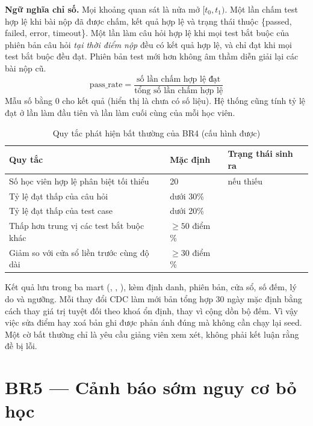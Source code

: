 \textbf{Ngữ nghĩa chỉ số.} Mọi khoảng quan sát là nửa mở $[t_0, t_1)$. Một lần chấm test hợp lệ khi bài nộp đã được chấm, kết quả hợp lệ và trạng thái thuộc \{passed, failed, error, timeout\}. Một lần làm câu hỏi hợp lệ khi mọi test bắt buộc của phiên bản câu hỏi \emph{tại thời điểm nộp} đều có kết quả hợp lệ, và chỉ đạt khi mọi test bắt buộc đều đạt. Phiên bản test mới hơn không âm thầm diễn giải lại các bài nộp cũ.
\[
  \text{pass\_rate} = \frac{\text{số lần chấm hợp lệ đạt}}{\text{tổng số lần chấm hợp lệ}}
\]
Mẫu số bằng 0 cho kết quả  (hiển thị là chưa có số liệu). Hệ thống cũng tính tỷ lệ đạt ở lần làm đầu tiên và lần làm cuối cùng của mỗi học viên.

\begin{table}[H]
\centering\small
\caption{Quy tắc phát hiện bất thường của BR4 (cấu hình được)}\label{tab:br4-rules}
\begin{tabularx}{\textwidth}{@{}YL{2.4cm}L{5.0cm}@{}}
\toprule
\textbf{Quy tắc} & \textbf{Mặc định} & \textbf{Trạng thái sinh ra} \\
\midrule
Số học viên hợp lệ phân biệt tối thiểu & 20 &  nếu thiếu \\
Tỷ lệ đạt thấp của câu hỏi & dưới 30\% &  \\
Tỷ lệ đạt thấp của test case & dưới 20\% &  \\
Thấp hơn trung vị các test bắt buộc khác & $\ge 50$ điểm \% &  \\
Giảm so với cửa sổ liền trước cùng độ dài & $\ge 30$ điểm \% &  \\
\bottomrule
\end{tabularx}
\end{table}

Kết quả lưu trong ba mart (, , ), kèm định danh, phiên bản, cửa sổ, số đếm, lý do và ngưỡng. Mỗi thay đổi CDC làm mới bản tổng hợp 30 ngày mặc định bằng cách thay giá trị tuyệt đối theo khoá ổn định, thay vì cộng dồn bộ đếm. Vì vậy việc sửa điểm hay xoá bản ghi được phản ánh đúng mà không cần chạy lại seed. Một cờ bất thường chỉ là yêu cầu giảng viên xem xét, không phải kết luận rằng đề bị lỗi.

\section{BR5 --- Cảnh báo sớm nguy cơ bỏ học}

